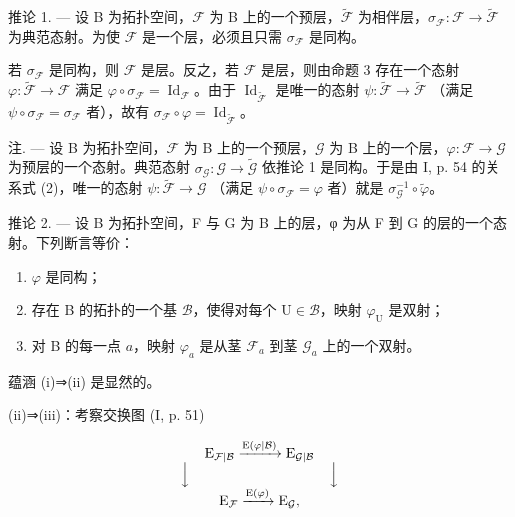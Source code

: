 推论 1. --- 设 B 为拓扑空间，\(\mathcal{F}\) 为 B 上的一个预层，\(\widetilde{\mathcal{F}}\) 为相伴层，\(\sigma_{\mathcal{F}}\colon \mathcal{F} \to \widetilde{\mathcal{F}}\) 为典范态射。为使 \(\mathcal{F}\) 是一个层，必须且只需 \(\sigma_{\mathcal{F}}\) 是同构。

若 \(\sigma_{\mathcal{F}}\) 是同构，则 \(\mathcal{F}\) 是层。反之，若 \(\mathcal{F}\) 是层，则由命题 3 存在一个态射 \(\varphi: \widetilde{\mathcal{F}} \to \mathcal{F}\) 满足 \(\varphi \circ \sigma_{\mathcal{F}} = \operatorname{Id}_{\mathcal{F}}\)。由于 \(\operatorname{Id}_{\widetilde{\mathcal{F}}}\) 是唯一的态射 \(\psi: \widetilde{\mathcal{F}} \to \widetilde{\mathcal{F}}\) （满足 \(\psi \circ \sigma_{\mathcal{F}} = \sigma_{\mathcal{F}}\) 者），故有 \(\sigma_{\mathcal{F}} \circ \varphi = \operatorname{Id}_{\widetilde{\mathcal{F}}}\)。

注. --- 设 B 为拓扑空间，\(\mathcal{F}\) 为 B 上的一个预层，\(\mathcal{G}\) 为 B 上的一个层，\(\varphi\colon\mathcal{F}\to\mathcal{G}\) 为预层的一个态射。典范态射 \(\sigma_{\mathcal{G}}\colon\mathcal{G}\to\widetilde{\mathcal{G}}\) 依推论 1 是同构。于是由 I, p. 54 的关系式 (2)，唯一的态射 \(\psi\colon\widetilde{\mathcal{F}}\to\mathcal{G}\) （满足 \(\psi\circ\sigma_{\mathcal{F}}=\varphi\) 者）就是 \(\sigma_{\mathcal{G}}^{-1}\circ\widetilde{\varphi}\)。

推论 2. --- 设 B 为拓扑空间，F 与 G 为 B 上的层，φ 为从 F 到 G 的层的一个态射。下列断言等价：

\begin{enumerate}
\def\labelenumi{(\roman{enumi})}
\item
  \(\varphi\) 是同构；
\item
  存在 B 的拓扑的一个基 \(\mathcal{B}\)，使得对每个 \(\mathrm{U} \in \mathcal{B}\)，映射 \(\varphi_{\mathrm{U}}\) 是双射；
\item
  对 B 的每一点 \(a\)，映射 \(\varphi_{a}\) 是从茎 \(\mathcal{F}_{a}\) 到茎 \(\mathcal{G}_{a}\) 上的一个双射。
\end{enumerate}

蕴涵 (i)⇒(ii) 是显然的。

(ii)⇒(iii)：考察交换图 (I, p. 51)

\[
\begin{array}{c} \mathrm{E} _ {\mathcal {F} | \mathcal {B}} \xrightarrow {\mathrm{E} (\varphi | \mathcal {B})} \mathrm{E} _ {\mathcal {G} | \mathcal {B}} \\ \Big \downarrow \qquad \qquad \qquad \qquad \qquad \Big \downarrow \\ \mathrm{E} _ {\mathcal {F}} \xrightarrow {\mathrm{E} (\varphi)} \mathrm{E} _ {\mathcal {G}}, \end{array}
\]

